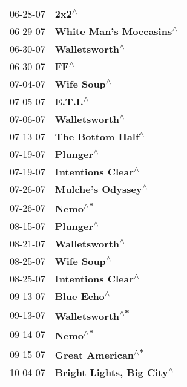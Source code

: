 \begin{supertabular}{p{0.25\columnwidth}p{0.75\columnwidth}}
 06-28-07 &                                 \textbf{2x2\textsuperscript{$\wedge$}} \\
 06-29-07 &               \textbf{White Man's Moccasins\textsuperscript{$\wedge$}} \\
 06-30-07 &                        \textbf{Walletsworth\textsuperscript{$\wedge$}} \\
 06-30-07 &                                  \textbf{FF\textsuperscript{$\wedge$}} \\
 07-04-07 &                           \textbf{Wife Soup\textsuperscript{$\wedge$}} \\
 07-05-07 &                              \textbf{E.T.I.\textsuperscript{$\wedge$}} \\
 07-06-07 &                        \textbf{Walletsworth\textsuperscript{$\wedge$}} \\
 07-13-07 &                     \textbf{The Bottom Half\textsuperscript{$\wedge$}} \\
 07-19-07 &                             \textbf{Plunger\textsuperscript{$\wedge$}} \\
 07-19-07 &                    \textbf{Intentions Clear\textsuperscript{$\wedge$}} \\
 07-26-07 &                    \textbf{Mulche's Odyssey\textsuperscript{$\wedge$}} \\
 07-26-07 &                               \textbf{Nemo\textsuperscript{$\wedge$*}} \\
 08-15-07 &                             \textbf{Plunger\textsuperscript{$\wedge$}} \\
 08-21-07 &                        \textbf{Walletsworth\textsuperscript{$\wedge$}} \\
 08-25-07 &                           \textbf{Wife Soup\textsuperscript{$\wedge$}} \\
 08-25-07 &                    \textbf{Intentions Clear\textsuperscript{$\wedge$}} \\
 09-13-07 &                           \textbf{Blue Echo\textsuperscript{$\wedge$}} \\
 09-13-07 &                       \textbf{Walletsworth\textsuperscript{$\wedge$*}} \\
 09-14-07 &                               \textbf{Nemo\textsuperscript{$\wedge$*}} \\
 09-15-07 &                     \textbf{Great American\textsuperscript{$\wedge$*}} \\
 10-04-07 &             \textbf{Bright Lights, Big City\textsuperscript{$\wedge$}} \\

\end{supertabular}

